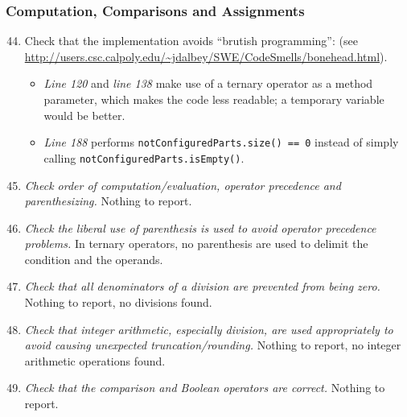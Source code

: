	\subsubsection{Computation, Comparisons and Assignments}
		\begin{enumerate}
			\setcounter{enumi}{43}
			\item \begin{itshape}
				Check that the implementation avoids “brutish programming”: (see \url{http://users.csc.calpoly.edu/~jdalbey/SWE/CodeSmells/bonehead.html}).
				\end{itshape}
			\begin{itemize}
				\item \textit{Line 120} and \textit{line 138} make use of a ternary operator as a method parameter, which makes the code less readable; a temporary variable would be better.
				\item \textit{Line 188} performs \texttt{notConfiguredParts.size() == 0} instead of simply calling \texttt{notConfiguredParts.isEmpty()}.
			\end{itemize}

			\item \textit{Check order of computation/evaluation, operator precedence and parenthesizing.}\newline
			Nothing to report. %

			\item \textit{Check the liberal use of parenthesis is used to avoid operator precedence problems.}\newline
			In ternary operators, no parenthesis are used to delimit the condition and the operands.

			\item \textit{Check that all denominators of a division are prevented from being zero.}\newline
			Nothing to report, no divisions found. %

			\item \textit{Check that integer arithmetic, especially division, are used appropriately to avoid causing unexpected truncation/rounding.}\newline
			Nothing to report, no integer arithmetic operations found. %

			\item \textit{Check that the comparison and Boolean operators are correct.}\newline
			Nothing to report. %


\end{enumerate}
